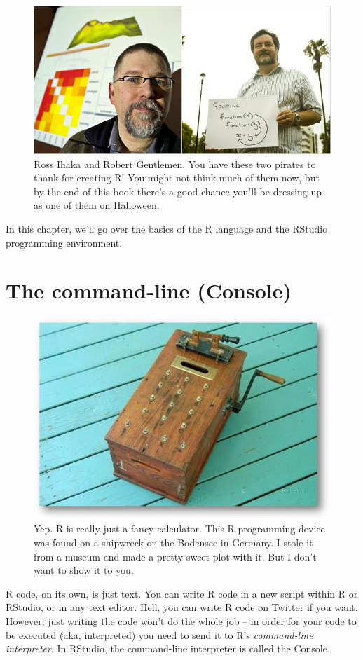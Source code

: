 \documentclass[]{book}
\theoremstyle{definition}
\theoremstyle{definition}
\theoremstyle{remark}
\begin{document}
\begin{figure}

{\centering \includegraphics[width=0.5\linewidth]{images/rauthors} 

}

\caption{Ross Ihaka and Robert Gentlemen. You have these two pirates to thank for creating R! You might not think much of them now, but by the end of this book there's a good chance you'll be dressing up as one of them on Halloween.}\label{fig:unnamed-chunk-51}
\end{figure}

In this chapter, we'll go over the basics of the R language and the
RStudio programming environment.

\section{The command-line (Console)}\label{the-command-line-console}

\begin{figure}

{\centering \includegraphics[width=0.5\linewidth]{images/woodcalc} 

}

\caption{Yep. R is really just a fancy calculator. This R programming device was found on a shipwreck on the Bodensee in Germany. I stole it from a museum and made a pretty sweet plot with it. But I don't want to show it to you.}\label{fig:unnamed-chunk-52}
\end{figure}

R code, on its own, is just text. You can write R code in a new script
within R or RStudio, or in any text editor. Hell, you can write R code
on Twitter if you want. However, just writing the code won't do the
whole job -- in order for your code to be executed (aka, interpreted)
you need to send it to R's \emph{command-line interpreter}. In RStudio,
the command-line interpreter is called the Console.
\end{document}
